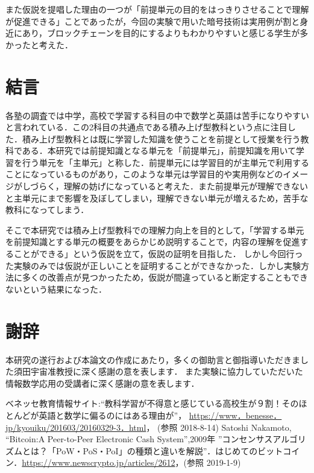 \documentclass[a4j,12pt]{jsarticle}
\begin{document}
また仮説を提唱した理由の一つが「前提単元の目的をはっきりさせることで理解が促進できる」ことであったが，今回の実験で用いた暗号技術は実用例が割と身近にあり，ブロックチェーンを目的にするよりもわかりやすいと感じる学生が多かったと考えた．



\newpage
\section{結言}
各塾の調査では中学，高校で学習する科目の中で数学と英語は苦手になりやすいと言われている\cite{1}．この2科目の共通点である積み上げ型教科という点に注目した．積み上げ型教科とは既に学習した知識を使うことを前提として授業を行う教科である．本研究では前提知識となる単元を「前提単元」，前提知識を用いて学習を行う単元を「主単元」と称した．前提単元には学習目的が主単元で利用することになっているものがあり，このような単元は学習目的や実用例などのイメージがしづらく，理解の妨げになっていると考えた．また前提単元が理解できないと主単元にまで影響を及ぼしてしまい，理解できない単元が増えるため，苦手な教科になってしまう．

そこで本研究では積み上げ型教科での理解力向上を目的として，「学習する単元を前提知識とする単元の概要をあらかじめ説明することで，内容の理解を促進することができる」という仮説を立て，仮説の証明を目指した．
しかし今回行った実験のみでは仮説が正しいことを証明することができなかった．しかし実験方法に多くの改善点が見つかったため，仮説が間違っていると断定することもできないという結果になった．

\newpage
\section{謝辞}
本研究の遂行および本論文の作成にあたり，多くの御助言と御指導いただきました須田宇宙准教授に深く感謝の意を表します．
また実験に協力していただいた情報数学応用の受講者に深く感謝の意を表します．


\newpage
\begin{thebibliography}{9}
ベネッセ教育情報サイト:“教科学習が不得意と感じている高校生が９割！そのほとんどが英語と数学に偏るのにはある理由が”， \url{https://www．benesse．jp/kyouiku/201603/20160329-3．html}， (参照 2018-8-14)
Satoshi Nakamoto, “Bitcoin:A Peer-to-Peer Electronic Cash System”,2009年
 ”コンセンサスアルゴリズムとは？「PoW・PoS・PoI」の種類と違いを解説”．はじめてのビットコイン．\url{https://www.newscrypto.jp/articles/2612}，(参照 2019-1-9)
\end{thebibliography}
\end{document}
